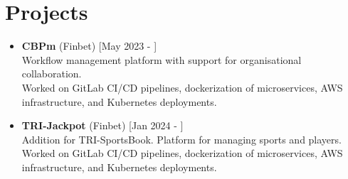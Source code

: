 \documentclass[a4paper]{moderncv}
\begin{document}
\section{Projects}	

		\begin{itemize}
			\item \textbf{CBPm} (Finbet) \hfill[May 2023 - ]\\
			Workflow management platform with support for organisational collaboration. \\
			Worked on GitLab CI/CD pipelines, dockerization of microservices, AWS infrastructure, and Kubernetes deployments.
			
			\item \textbf{TRI-Jackpot} (Finbet) \hfill[Jan 2024 - ]\\
			Addition for TRI-SportsBook. Platform for managing sports and players. \\
			Worked on GitLab CI/CD pipelines, dockerization of microservices, AWS infrastructure, and Kubernetes deployments.

			
			


\end{itemize}
\end{document}
